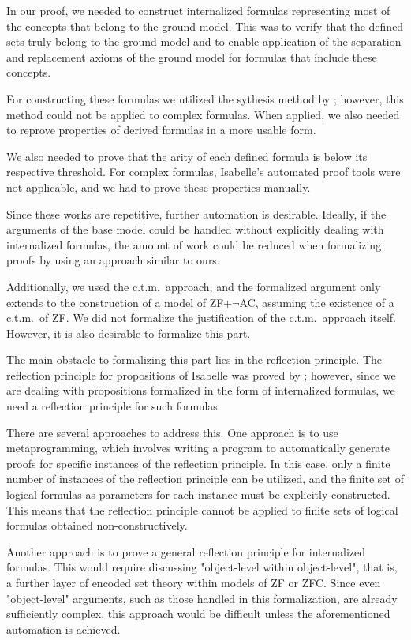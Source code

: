 \documentclass{report}
\begin{document}
In our proof, we needed to construct internalized formulas 
representing most of the concepts that belong to the ground model. 
This was to verify that the defined sets truly belong to the ground model 
and to enable application of the separation and replacement axioms of the ground model for formulas that include these concepts.

For constructing these formulas we utilized the sythesis method by \cite{gunther_forcing};
however, this method could not be applied to complex formulas.
When applied, we also needed to reprove properties of derived formulas in a more usable form.

We also needed to prove that the arity of each defined formula is below its respective threshold.
For complex formulas, Isabelle's automated proof tools were not applicable, 
and we had to prove these properties manually.

Since these works are repetitive, further automation is desirable.
Ideally, if the arguments of the base model could be handled without explicitly dealing with internalized formulas, 
the amount of work could be reduced when formalizing proofs by using an approach similar to ours.

Additionally, we used the c.t.m.\ approach, and the formalized argument only extends to the construction of a model of ZF+$\neg$AC,
assuming the existence of a c.t.m.\ of ZF.
We did not formalize the justification of the c.t.m.\ approach itself.
However, it is also desirable to formalize this part.

The main obstacle to formalizing this part lies in the reflection principle. 
The reflection principle for propositions of Isabelle 
was proved by \cite{paulson_reflection}; 
however, since we are dealing with propositions formalized in the form of internalized formulas, 
we need a reflection principle for such formulas.

There are several approaches to address this. 
One approach is to use metaprogramming, 
which involves writing a program to automatically generate proofs 
for specific instances of the reflection principle. 
In this case, only a finite number of instances of the reflection principle can be utilized, 
and the finite set of logical formulas as parameters for each instance must be explicitly constructed. 
This means that the reflection principle cannot be applied to finite sets of logical formulas obtained non-constructively.

Another approach is to prove a general reflection principle for internalized formulas. 
This would require discussing "object-level within object-level", that is, 
a further layer of encoded set theory within models of ZF or ZFC. Since even "object-level" arguments, 
such as those handled in this formalization, are already sufficiently complex, 
this approach would be difficult unless the aforementioned automation is achieved.
\end{document}
